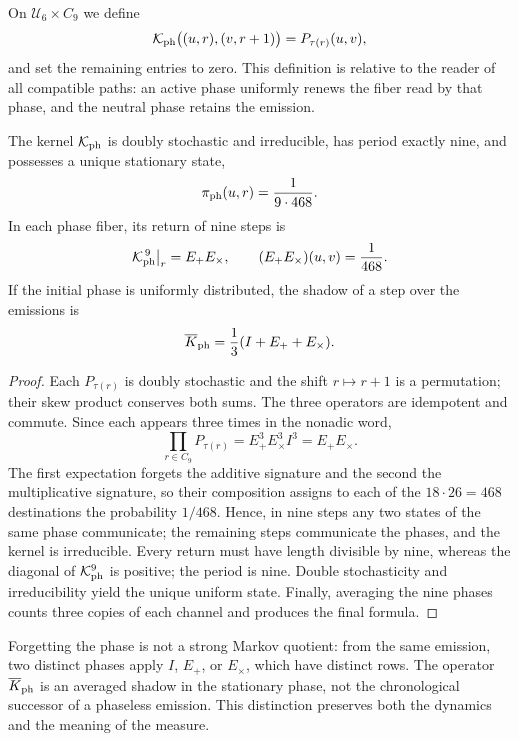 \begin{definition}
\label{def:transferencia-tpk-fase}
On \(\mathcal U_6\times C_9\) we define
\[
 \mathcal K_{\rm ph}\bigl((u,r),(v,r+1)\bigr)
 =P_{\tau(r)}(u,v),
\]
and set the remaining entries to zero. This definition is relative to the reader of
all compatible paths: an active phase uniformly renews the fiber
read by that phase, and the neutral phase retains the emission.
\end{definition}

\begin{theorem}
\label{thm:retorno-nonadico-uniforme}
The kernel \(\mathcal K_{\rm ph}\) is doubly stochastic and irreducible,
has period exactly nine, and possesses a unique stationary state,
\[
 \pi_{\rm ph}(u,r)=\frac1{9\cdot468}.
\]
In each phase fiber, its return of nine steps is
\[
 \mathcal K_{\rm ph}^{\,9}\big|_r=E_+E_\times,
 \qquad
 (E_+E_\times)(u,v)=\frac1{468}.
\]
If the initial phase is uniformly distributed, the shadow of a step over
the emissions is
\[
 \overline K_{\rm ph}=\frac13(I+E_++E_\times).
\]
\end{theorem}

\begin{proof}
Each \(P_{\tau(r)}\) is doubly stochastic and the shift
\(r\mapsto r+1\) is a permutation; their skew product conserves both sums.
The three operators are idempotent and commute. Since each appears three
times in the nonadic word,
\[
 \prod_{r\in C_9}P_{\tau(r)}
 =E_+^3E_\times^3I^3=E_+E_\times.
\]
The first expectation forgets the additive signature and the second the multiplicative signature,
so their composition assigns to each of the \(18\cdot26=468\)
destinations the probability \(1/468\). Hence, in nine steps any two states of the same phase communicate; the
remaining steps communicate the phases, and the kernel is irreducible. Every return
must have length divisible by nine, whereas the diagonal of \(\mathcal K_{\rm ph}^9\) is positive;
the period is nine. Double stochasticity and irreducibility yield the unique
uniform state. Finally, averaging the nine phases counts three
copies of each channel and produces the final formula.
\end{proof}

Forgetting the phase is not a strong Markov quotient: from the same emission, two distinct phases apply \(I\), \(E_+\), or \(E_\times\), which have distinct rows. The operator \(\overline K_{\rm ph}\) is an averaged shadow in the stationary phase, not the chronological successor of a phaseless emission. This distinction preserves both the dynamics and the meaning of the measure.

